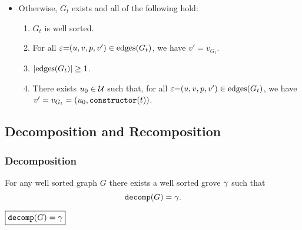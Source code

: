 \begin{definition}
\begin{itemize}
    \item Otherwise, $G_t$ exists and all of the following hold:
      \begin{enumerate}
        \item $G_t$ is well sorted.
        \item For all $\varepsilon{=}(u, v, p, v') \in \text{edges}\mathopen{}\left(G_t\right)\mathclose{}$,
          we have $v' = v_{G_t}$.
        \item $\left\lvert\text{edges}\mathopen{}\left(G_t\right)\mathclose{}\right\rvert \geq 1$.
        \item There exists $u_0 \in \mathcal{U}$ such that,
          for all $\varepsilon{=}(u, v, p, v') \in \text{edges}\mathopen{}\left(G_t\right)\mathclose{}$,
          we have $v' = v_{G_t} = (u_0, \operatorname{\texttt{constructor}}\mathopen{}\left(t\right)\mathclose{})$.
      \end{enumerate}
  \end{itemize}
\end{definition}



\subsection{Decomposition and Recomposition}

\figureDecompositionDefHelpersContent


\subsubsection{Decomposition}

\begin{theorem}
  For any well sorted graph $G$
  there exists a well sorted grove $\gamma$
  such that \[\operatorname{\texttt{decomp}}\mathopen{}\left(G\right)\mathclose{} = \gamma.\]
\end{theorem}


\noindent $\boxed{\operatorname{\texttt{decomp}}\mathopen{}\left(G\right)\mathclose{} = \gamma}$
%
\figureDecompositionDefDecomp

